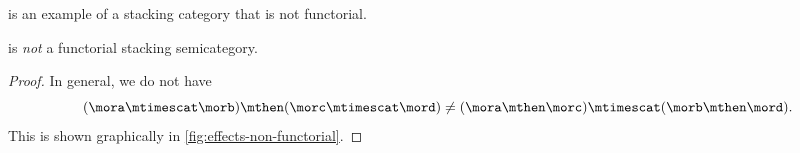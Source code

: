 \Effects is an example of a stacking category that is not functorial.

\begin{lemma}
    \Effects is \emph{not} a functorial stacking semicategory.
\end{lemma}

\begin{proof}
    In general, we do not have
    \begin{equation}
        (\mora \mtimescat \morb )
        \mthen (\morc \mtimescat \mord )
        \neq
        (\mora \mthen \morc ) \mtimescat (\morb \mthen \mord ).
    \end{equation}
    This is shown graphically in \cref{fig:effects-non-functorial}.
\end{proof}

\begin{figure*}[b]
    \centering
    \hfill
    \hfill
    \hfill
    \caption{Proof that \Effects is not a functorial stacking category by showing that
        the two morphisms above have different representations in~\SetL.}
    \label{fig:effects-non-functorial}
\end{figure*}

